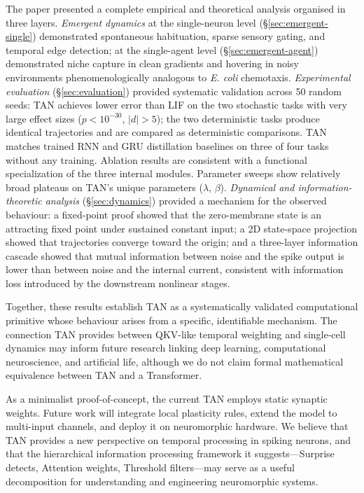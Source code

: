 The paper presented a complete empirical and theoretical analysis organised in three layers. \textit{Emergent dynamics} at the single-neuron level (\S\ref{sec:emergent-single}) demonstrated spontaneous habituation, sparse sensory gating, and temporal edge detection; at the single-agent level (\S\ref{sec:emergent-agent}) demonstrated niche capture in clean gradients and hovering in noisy environments phenomenologically analogous to \textit{E. coli} chemotaxis. \textit{Experimental evaluation} (\S\ref{sec:evaluation}) provided systematic validation across 50 random seeds: TAN achieves lower error than LIF on the two stochastic tasks with very large effect sizes ($p<10^{-30}$, $|d|>5$); the two deterministic tasks produce identical trajectories and are compared as deterministic comparisons. TAN matches trained RNN and GRU distillation baselines on three of four tasks without any training. Ablation results are consistent with a functional specialization of the three internal modules. Parameter sweeps show relatively broad plateaus on TAN's unique parameters ($\lambda$, $\beta$). \textit{Dynamical and information-theoretic analysis} (\S\ref{sec:dynamics}) provided a mechanism for the observed behaviour: a fixed-point proof showed that the zero-membrane state is an attracting fixed point under sustained constant input; a 2D state-space projection showed that trajectories converge toward the origin; and a three-layer information cascade showed that mutual information between noise and the spike output is lower than between noise and the internal current, consistent with information loss introduced by the downstream nonlinear stages.

Together, these results establish TAN as a systematically validated computational primitive whose behaviour arises from a specific, identifiable mechanism. The connection TAN provides between QKV-like temporal weighting and single-cell dynamics may inform future research linking deep learning, computational neuroscience, and artificial life, although we do not claim formal mathematical equivalence between TAN and a Transformer.

As a minimalist proof-of-concept, the current TAN employs static synaptic weights. Future work will integrate local plasticity rules, extend the model to multi-input channels, and deploy it on neuromorphic hardware. We believe that TAN provides a new perspective on temporal processing in spiking neurons, and that the hierarchical information processing framework it suggests---Surprise detects, Attention weights, Threshold filters---may serve as a useful decomposition for understanding and engineering neuromorphic systems.

